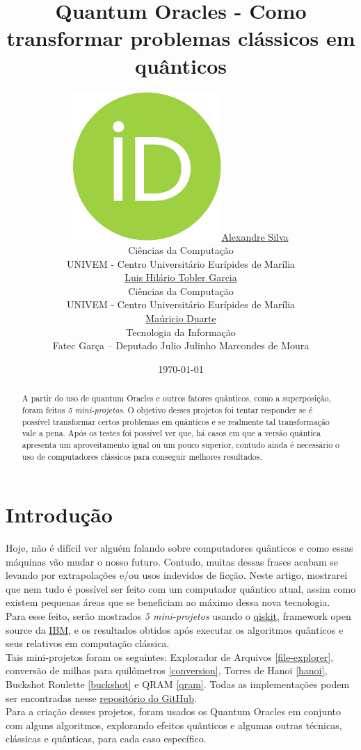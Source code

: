 \documentclass{article}
\title{Quantum Oracles - Como transformar problemas clássicos em quânticos}
\date{\today}
\author{ 
	\href{https://orcid.org/0009-0008-9134-5974}{\includegraphics[scale=0.06]{orcid.pdf}\hspace{1mm}Alexandre Silva}\\
	Ciências da Computação\\
	UNIVEM - Centro Universitário Eurípides de Marília\\
	\And
	\href{http://lattes.cnpq.br/5170103189904688}{\hspace{1mm}Luis Hilário Tobler Garcia} \\
	Ciências da Computação\\
	UNIVEM - Centro Universitário Eurípides de Marília\\
	\And
	\href{http://lattes.cnpq.br/7265559606596355}{\hspace{1mm}Maúricio Duarte} \\
	Tecnologia da Informação \\
	Fatec Garça – Deputado Julio Julinho Marcondes de Moura\\
}
\begin{document}
\maketitle
\begin{abstract}
	A partir do uso de quantum Oracles e outros fatores quânticos, como a superposição, foram feitos \emph{5 mini-projetos}. O objetivo desses projetos foi tentar responder se é possível transformar certos problemas em quânticos e se realmente tal transformação vale a pena. Após os testes foi possível ver que, há casos em que a versão quântica apresenta um aproveitamento igual ou um pouco superior, contudo ainda é necessário o uso de computadores clássicos para conseguir melhores resultados.
\end{abstract}


\section{Introdução}
Hoje, não é difícil ver alguém falando sobre computadores quânticos e como essas máquinas vão mudar o nosso futuro. Contudo, muitas dessas frases acabam se levando por extrapolações e/ou usos indevidos de ficção. Neste artigo, mostrarei que nem tudo é possível ser feito com um computador quântico atual, assim como existem pequenas áreas que se beneficiam ao máximo dessa nova tecnologia.\\
Para esse feito, serão mostrados \emph{5 mini-projetos} usando o \href{https://www.ibm.com/quantum/qiskit}{qiskit}, framework open source da \href{https://www.ibm.com/}{IBM}, e os resultados obtidos após executar os algoritmos quânticos e seus relativos em computação clássica.\\
Tais mini-projetos foram os seguintes: Explorador de Arquivos \ref{file-explorer}, conversão de milhas para quilômetros \ref{conversion}, Torres de Hanoi \ref{hanoi}, Buckshot Roulette \ref{buckshot} e QRAM \ref{qram}. Todas as implementações podem ser encontradas nesse  \href{https://github.com/Dpbm/scientific-initiation-1-quantum-oracles}{repositório do GitHub}.\\
Para a criação desses projetos, foram usados os Quantum Oracles em conjunto com alguns algoritmos, explorando efeitos quânticos e algumas outras técnicas, clássicas e quânticas, para cada caso específico.
\end{document}

